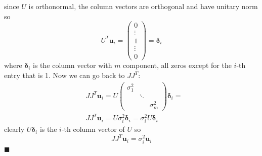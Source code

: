 \documentclass[10pt, a4paper]{report}
\begin{document}
since $U$ is orthonormal, the column vectors are orthogonal and have unitary norm so\begin{equation}
    U^T\mathbf u_i=\begin{pmatrix}
        0 \\ \vdots \\ 1 \\ \vdots \\ 0
    \end{pmatrix}=\boldsymbol\delta_i
\end{equation}
where $\boldsymbol\delta_i$ is the column vector with $m$ component, all zeros except for the $i$-th entry that is 1. Now we can go back to  $JJ^T$:\begin{align}
    &JJ^T\mathbf u_i=U\begin{pmatrix}
        \sigma_1^2 & &  \\ 
        & \ddots &   \\ 
        & & \sigma_m^2 
    \end{pmatrix} \boldsymbol\delta_i=\\
    &JJ^T\mathbf u_i=U\sigma_i^2\boldsymbol\delta_i=\sigma_i^2 U \boldsymbol\delta_i
\end{align}
clearly $U \boldsymbol\delta_i$ is the $i$-th column vector of $U$ so\begin{equation}
    JJ^T\mathbf u_i=\sigma_i^2\mathbf u_i
\end{equation}
\hfill$\blacksquare$\bigskip
\end{document}
